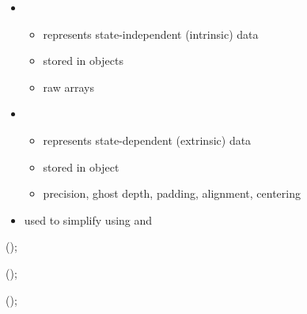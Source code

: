 \NEWSEC

\subsection{\ssFields}

\begin{frame}[fragile,label=ss-fields] 
\secframetitle{\ssFields}
\ \\

\begin{itemize}
\item {}
\begin{itemize}
\item represents state-independent (intrinsic) data
\item stored in   objects
\item raw arrays
\end{itemize}
\item {}
\begin{itemize}
\item represents state-dependent (extrinsic) data
\item stored in  object
\item precision, ghost depth, padding, alignment, centering
\end{itemize}
\item {} used to simplify using  and 
\end{itemize}
\end{frame}


\begin{frame}[fragile] 
\secframetitle{\ssFields}
\footnotesize
\begin{semiverbatim}

     ();

     ();

     ();
 
\end{semiverbatim}
\end{frame}


